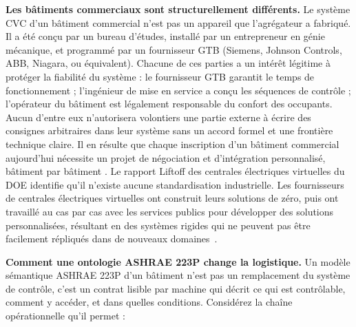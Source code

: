\textbf{Les bâtiments commerciaux sont structurellement différents.}
Le système CVC d'un bâtiment commercial n'est pas un appareil que l'agrégateur a fabriqué.
Il a été conçu par un bureau d'études, installé par un entrepreneur en génie mécanique, et programmé par un
fournisseur GTB (Siemens, Johnson Controls, ABB, Niagara, ou équivalent).
Chacune de ces parties a un intérêt légitime à protéger la fiabilité du système : le fournisseur GTB
garantit le temps de fonctionnement ; l'ingénieur de mise en service a conçu les séquences de contrôle ; l'opérateur du bâtiment
est légalement responsable du confort des occupants.
Aucun d'entre eux n'autorisera volontiers une partie externe à écrire des consignes arbitraires dans leur système
sans un accord formel et une frontière technique claire.
Il en résulte que chaque inscription d'un bâtiment commercial aujourd'hui nécessite un projet de négociation et d'intégration
personnalisé, bâtiment par bâtiment \cite{DOE_VPP2025}.
Le rapport Liftoff des centrales électriques virtuelles du DOE identifie qu'il n'existe aucune standardisation industrielle.
Les fournisseurs de centrales électriques virtuelles ont construit leurs solutions de zéro, puis
ont travaillé au cas par cas avec les services publics pour développer des solutions personnalisées, résultant en des systèmes rigides
qui ne peuvent pas être facilement répliqués dans de nouveaux domaines~\cite{DOE_VPP2025}.

\textbf{Comment une ontologie ASHRAE 223P change la logistique.}
Un modèle sémantique ASHRAE 223P d'un bâtiment n'est pas un remplacement du système de contrôle, c'est un
contrat lisible par machine qui décrit ce qui est contrôlable, comment y accéder, et dans quelles
conditions.
Considérez la chaîne opérationnelle qu'il permet :

